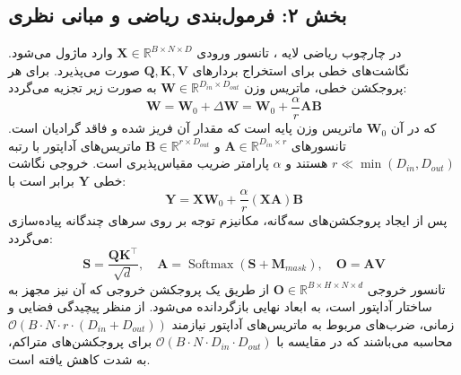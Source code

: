 \subsection*{بخش ۲: فرمول‌بندی ریاضی و مبانی نظری }
در چارچوب ریاضی لایه ، تانسور ورودی $\mathbf{X} \in \mathbb{R}^{B \times N \times D}$ وارد ماژول می‌شود. نگاشت‌های خطی برای استخراج بردارهای $\mathbf{Q}, \mathbf{K}, \mathbf{V}$ صورت می‌پذیرد. برای هر پروجکشن خطی، ماتریس وزن $\mathbf{W} \in \mathbb{R}^{D_{in} \times D_{out}}$ به صورت زیر تجزیه می‌گردد:
\begin{equation}
\mathbf{W} = \mathbf{W}_0 + \Delta\mathbf{W} = \mathbf{W}_0 + \frac{\alpha}{r} \mathbf{A} \mathbf{B}
\end{equation}
که در آن $\mathbf{W}_0$ ماتریس وزن پایه  است که مقدار آن فریز شده و فاقد گرادیان است. تانسورهای $\mathbf{A} \in \mathbb{R}^{D_{in} \times r}$ و $\mathbf{B} \in \mathbb{R}^{r \times D_{out}}$ ماتریس‌های آداپتور با رتبه $r \ll \min(D_{in}, D_{out})$ هستند و $\alpha$ پارامتر ضریب مقیاس‌پذیری  است. خروجی نگاشت خطی $\mathbf{Y}$ برابر است با:
\begin{equation}
\mathbf{Y} = \mathbf{X} \mathbf{W}_0 + \frac{\alpha}{r} (\mathbf{X} \mathbf{A}) \mathbf{B}
\end{equation}
پس از ایجاد پروجکشن‌های سه‌گانه، مکانیزم توجه بر روی سرهای چندگانه پیاده‌سازی می‌گردد:
\begin{equation}
\mathbf{S} = \frac{\mathbf{Q} \mathbf{K}^\top}{\sqrt{d}}, \quad \mathbf{A} = \operatorname{Softmax}\left( \mathbf{S} + \mathbf{M}_{mask} \right), \quad \mathbf{O} = \mathbf{A} \mathbf{V}
\end{equation}
تانسور خروجی $\mathbf{O} \in \mathbb{R}^{B \times H \times N \times d}$ از طریق یک پروجکشن خروجی که آن نیز مجهز به ساختار آداپتور است، به ابعاد نهایی بازگردانده می‌شود. از منظر پیچیدگی فضایی و زمانی، ضرب‌های مربوط به ماتریس‌های آداپتور نیازمند $\mathcal{O}(B \cdot N \cdot r \cdot (D_{in} + D_{out}))$ محاسبه می‌باشند که در مقایسه با $\mathcal{O}(B \cdot N \cdot D_{in} \cdot D_{out})$ برای پروجکشن‌های متراکم، به شدت کاهش یافته است.

